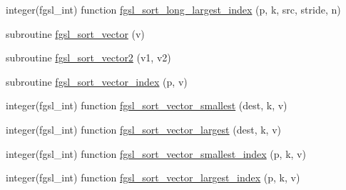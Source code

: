 \begin{DoxyCompactItemize}
\item 
integer(fgsl\-\_\-int) function \hyperlink{sort_8finc_a49b77db1a738b1500cf01500e77a63cc}{fgsl\-\_\-sort\-\_\-long\-\_\-largest\-\_\-index} (p, k, src, stride, n)
\item 
subroutine \hyperlink{sort_8finc_ae260f94887ee5bdfdb33bbe94eb83143}{fgsl\-\_\-sort\-\_\-vector} (v)
\item 
subroutine \hyperlink{sort_8finc_aaf339d54c8b44755134ee15293303f09}{fgsl\-\_\-sort\-\_\-vector2} (v1, v2)
\item 
subroutine \hyperlink{sort_8finc_a818d4e659a7756cbf3d20d33ae53b418}{fgsl\-\_\-sort\-\_\-vector\-\_\-index} (p, v)
\item 
integer(fgsl\-\_\-int) function \hyperlink{sort_8finc_a0e00f85dfc87a4eefab581ca773362d1}{fgsl\-\_\-sort\-\_\-vector\-\_\-smallest} (dest, k, v)
\item 
integer(fgsl\-\_\-int) function \hyperlink{sort_8finc_ac0555f574fa147cddc39c7a027c5d9ae}{fgsl\-\_\-sort\-\_\-vector\-\_\-largest} (dest, k, v)
\item 
integer(fgsl\-\_\-int) function \hyperlink{sort_8finc_ac094e38c25cd8d2532ce3729a564a199}{fgsl\-\_\-sort\-\_\-vector\-\_\-smallest\-\_\-index} (p, k, v)
\item 
integer(fgsl\-\_\-int) function \hyperlink{sort_8finc_a5b6b9851e59760427ededc824ea5866d}{fgsl\-\_\-sort\-\_\-vector\-\_\-largest\-\_\-index} (p, k, v)
\end{DoxyCompactItemize}


